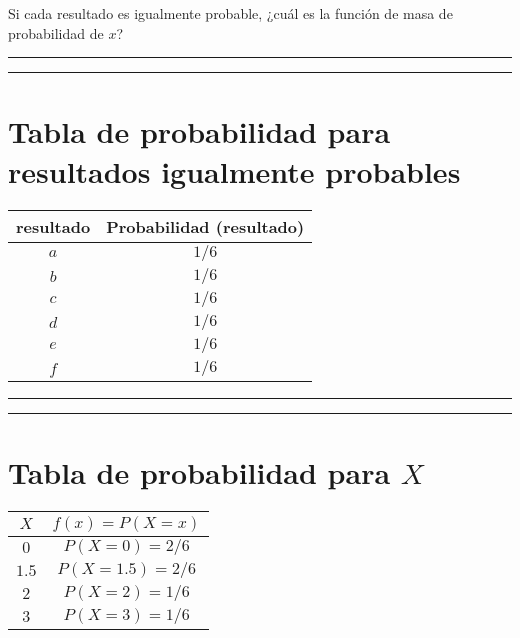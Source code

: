 \documentclass[
]{book}
\begin{document}
Si cada resultado es igualmente probable, ¿cuál es la función de masa de probabilidad de \(x\)?

\begin{center}\rule{0.5\linewidth}{0.5pt}\end{center}

\begin{center}\rule{0.5\linewidth}{0.5pt}\end{center}

\hypertarget{tabla-de-probabilidad-para-resultados-igualmente-probables}{%
\section{Tabla de probabilidad para resultados igualmente probables}\label{tabla-de-probabilidad-para-resultados-igualmente-probables}}

\begin{longtable}[]{@{}cc@{}}
\toprule
resultado & Probabilidad (resultado) \\
\midrule
\endhead
\(a\) & \(1/6\) \\
\(b\) & \(1/6\) \\
\(c\) & \(1/6\) \\
\(d\) & \(1/6\) \\
\(e\) & \(1/6\) \\
\(f\) & \(1/6\) \\
\bottomrule
\end{longtable}

\begin{center}\rule{0.5\linewidth}{0.5pt}\end{center}

\begin{center}\rule{0.5\linewidth}{0.5pt}\end{center}

\hypertarget{tabla-de-probabilidad-para-x}{%
\section{\texorpdfstring{Tabla de probabilidad para \(X\)}{Tabla de probabilidad para X}}\label{tabla-de-probabilidad-para-x}}

\begin{longtable}[]{@{}cc@{}}
\toprule
\(X\) & \(f(x)=P(X=x)\) \\
\midrule
\endhead
\(0\) & \(P(X=0)=2/6\) \\
\(1.5\) & \(P(X=1.5)=2/6\) \\
\(2\) & \(P(X=2)=1/6\) \\
\(3\) & \(P(X=3)=1/6\) \\
\bottomrule
\end{longtable}
\end{document}

